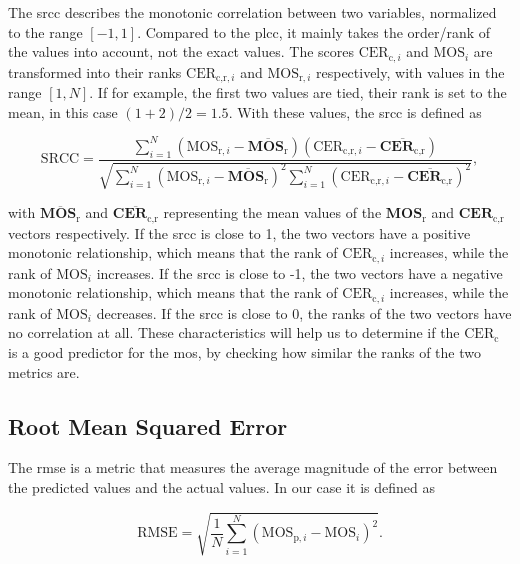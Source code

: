 The \gls{srcc} \cite{pears_spear_2016} describes the monotonic correlation between two variables, normalized to the range $[-1, 1]$.
Compared to the \gls{plcc}, it mainly takes the order/rank of the values into account, not the exact values.
The scores $\text{CER}_{\text{c},i}$ and $\text{MOS}_{i}$ are transformed into their ranks $\text{CER}_{\text{c,r},i}$ and $\text{MOS}_{\text{r},i}$ respectively, with values in the range $[1, N]$.
If for example, the first two values are tied, their rank is set to the mean, in this case $(1+2)/2 = 1.5$.
With these values, the \gls{srcc} is defined as

\begin{equation}
    \text{SRCC} = \frac{\sum_{i=1}^{N}{(\text{MOS}_{\text{r},i}-\overline{\mathbf{MOS}_{\text{r}}})(\text{CER}_{\text{c,r},i}-\overline{\mathbf{CER}_{\text{c,r}}})}}{\sqrt{\sum_{i=1}^{N}{(\text{MOS}_{\text{r},i}-\overline{\mathbf{MOS}_{\text{r}}})^2}\sum_{i=1}^{N}{(\text{CER}_{\text{c,r},i}-\overline{\mathbf{CER}_{\text{c,r}}})^2}}},
    \label{eq:spearman}
\end{equation}

with $\overline{\mathbf{MOS}_{\text{r}}}$ and $\overline{\mathbf{CER}_{\text{c,r}}}$ representing the mean values of the $\mathbf{MOS}_{\text{r}}$ and $\mathbf{CER}_{\text{c,r}}$ vectors respectively.
If the \gls{srcc} is close to 1, the two vectors have a positive monotonic relationship, which means that the rank of $\text{CER}_{\text{c},i}$ increases, while the rank of $\text{MOS}_{i}$ increases.
If the \gls{srcc} is close to -1, the two vectors have a negative monotonic relationship, which means that the rank of $\text{CER}_{\text{c},i}$ increases, while the rank of $\text{MOS}_{i}$ decreases.
If the \gls{srcc} is close to 0, the ranks of the two vectors have no correlation at all.
These characteristics will help us to determine if the $\text{CER}_{\text{c}}$ is a good predictor for the \gls{mos}, by checking how similar the ranks of the two metrics are.


\subsection{Root Mean Squared Error}
\label{subsec:rmse}

The \gls{rmse} is a metric that measures the average magnitude of the error between the predicted values and the actual values.
In our case it is defined as

\begin{equation}
    \text{RMSE} = \sqrt{\frac{1}{N}\sum_{i=1}^{N}{(\text{MOS}_{\text{p},i} - \text{MOS}_{i})^2}}.
    \label{eq:rmse}
\end{equation}

